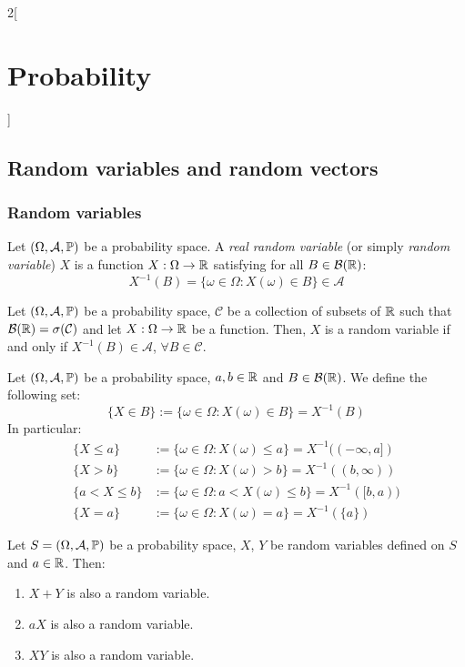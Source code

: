 \documentclass[../../../main.tex]{subfiles}
\begin{document}
\begin{multicols}{2}[\section{Probability}]
  \subsection{Random variables and random vectors}
  \subsubsection{Random variables}
  \begin{definition}
    Let $(\Omega,\mathcal{A},\mathbb{P})$ be a probability space. A \textit{real random variable} (or simply \emph{random variable}) $X$ is a function $X:\Omega\rightarrow\mathbb{R}$ satisfying for all $B\in\mathcal{B}(\mathbb{R})$: $$X^{-1}(B)=\{\omega\in\Omega:X(\omega)\in B\}\in\mathcal{A}$$
  \end{definition}
  \begin{prop}
    Let $(\Omega,\mathcal{A},\mathbb{P})$ be a probability space, $\mathcal{C}$ be a collection of subsets of $\mathbb{R}$ such that $\mathcal{B}(\mathbb{R})=\sigma(\mathcal{C})$ and let $X:\Omega\rightarrow\mathbb{R}$ be a function. Then, $X$ is a random variable if and only if $X^{-1}(B)\in\mathcal{A}$, $\forall B\in \mathcal{C}$.
  \end{prop}
  \begin{definition}
    Let $(\Omega,\mathcal{A},\mathbb{P})$ be a probability space, $a,b\in\mathbb{R}$ and $B\in\mathcal{B}(\mathbb{R})$. We define the following set:
    $$\{X\in B\}:=\{\omega\in\Omega:X(\omega)\in B\}=X^{-1}(B)$$
    In particular:
    \begin{align*}
      \{X\leq a\}   & :=\{\omega\in\Omega:X(\omega)\leq a\}=X^{-1}((-\infty,a]) \\
      \{X> b\}      & :=\{\omega\in\Omega:X(\omega)>b\}=X^{-1}((b,\infty))      \\
      \{a<X\leq b\} & :=\{\omega\in\Omega:a< X(\omega)\leq b\}=X^{-1}([b,a))    \\
      \{X=a\}       & :=\{\omega\in\Omega:X(\omega)=a\}=X^{-1}(\{a\})
    \end{align*}
  \end{definition}
  \begin{prop}
    Let $S=(\Omega,\mathcal{A},\mathbb{P})$ be a probability space, $X$, $Y$ be random variables defined on $S$ and $a\in\mathbb{R}$. Then:
    \begin{enumerate}
      \item $X+Y$ is also a random variable.
      \item $aX$ is also a random variable.
      \item $XY$ is also a random variable.

\end{enumerate}
\end{prop}
\end{multicols}
\end{document}
